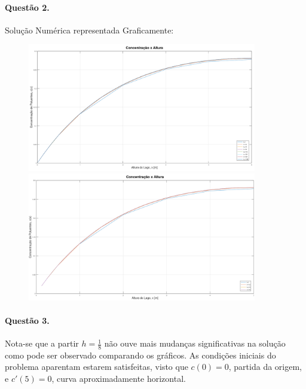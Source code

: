 \documentclass{article}
\begin{document}
        \paragraph{Questão 2.}Solução Numérica representada Graficamente:
            \begin{figure}[h]
                \includegraphics[width = 10cm]{grafico1.png}
                \includegraphics[width = 10cm]{grafico2.png}
                \centering
            \end{figure}

        \paragraph{Questão 3.}Nota-se que a partir $h = \frac{1}{8}$ não ouve mais mudanças significativas na solução como pode ser observado comparando os gráficos. As condições iniciais do problema aparentam estarem satisfeitas, visto que $c(0) = 0$, partida da origem, e $c'(5) = 0$, curva aproximadamente horizontal.
\newpage
\end{document}
